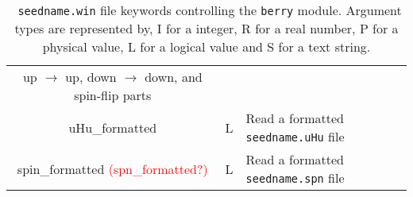 \begin{table}[hH!]
\begin{center}
\begin{tabular}{|c|c|p{6cm}|}
  up $\rightarrow$ up, down $\rightarrow$ down, and spin-flip parts\\
  {\sc uHu\_formatted}& L & Read a formatted {\tt seedname.uHu} file \\
  {\sc spin\_formatted} \textcolor{red}{({\sc spn\_formatted}?)}& L & Read a formatted {\tt seedname.spn} file \\
  \hline
\end{tabular}
\caption[Parameter file keywords controlling the Berry module.]  {{\tt
    seedname.win} file keywords controlling the {\tt berry}
  module. Argument types are represented by, I for a integer, R for a
  real number, P for a physical value, L for a logical value and S for
  a text string.}
\label{parameter_keywords_berry}
\end{center}
\end{table}



